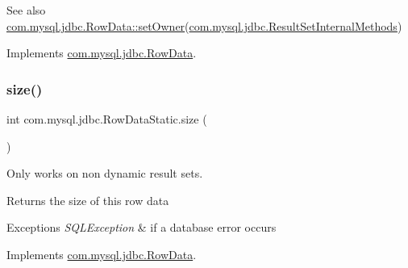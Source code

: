\begin{DoxySeeAlso}{See also}
\mbox{\hyperlink{interfacecom_1_1mysql_1_1jdbc_1_1_row_data_ad2c7f5220e0bd60681453d3d294607cc}{com.\+mysql.\+jdbc.\+Row\+Data\+::set\+Owner}}(\mbox{\hyperlink{interfacecom_1_1mysql_1_1jdbc_1_1_result_set_internal_methods}{com.\+mysql.\+jdbc.\+Result\+Set\+Internal\+Methods}}) 
\end{DoxySeeAlso}


Implements \mbox{\hyperlink{interfacecom_1_1mysql_1_1jdbc_1_1_row_data_ad2c7f5220e0bd60681453d3d294607cc}{com.\+mysql.\+jdbc.\+Row\+Data}}.

\mbox{\label{classcom_1_1mysql_1_1jdbc_1_1_row_data_static_a68dbbf37a23e7933db5e775de1ec27f5}} 
\subsubsection{\texorpdfstring{size()}{size()}}
{\footnotesize\ttfamily int com.\+mysql.\+jdbc.\+Row\+Data\+Static.\+size (\begin{DoxyParamCaption}{ }\end{DoxyParamCaption})}

Only works on non dynamic result sets.

\begin{DoxyReturn}{Returns}
the size of this row data 
\end{DoxyReturn}

\begin{DoxyExceptions}{Exceptions}
{\em S\+Q\+L\+Exception} & if a database error occurs \\
\hline
\end{DoxyExceptions}


Implements \mbox{\hyperlink{interfacecom_1_1mysql_1_1jdbc_1_1_row_data_a7c6f91ddc0fcd7f5f12a64c7dc019995}{com.\+mysql.\+jdbc.\+Row\+Data}}.

\mbox{\label{classcom_1_1mysql_1_1jdbc_1_1_row_data_static_a4f28134023a2a4521847430d3cab6cd4}} 
